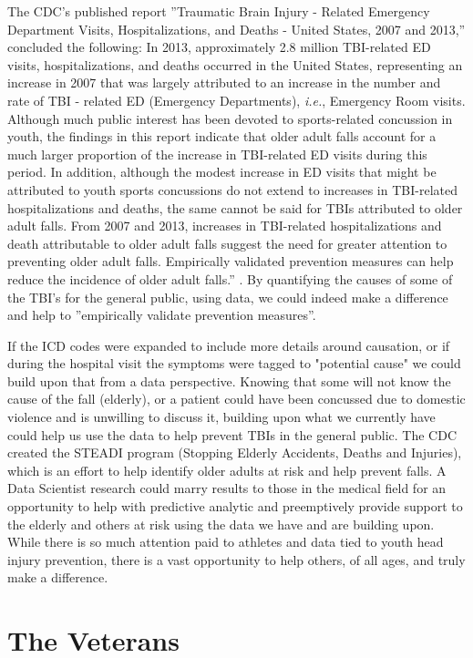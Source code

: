 \documentclass[sigconf]{acmart}
\begin{document}
The CDC's published report ''Traumatic Brain Injury - Related Emergency Department Visits, Hospitalizations, and Deaths - United States, 2007 and 2013,'' concluded the following: In 2013, approximately 2.8 million TBI-related ED visits, hospitalizations, and deaths occurred in the United States, representing an increase in 2007 that was largely attributed to an increase in the number and rate of TBI - related ED (Emergency Departments), {\em i.e.}, Emergency Room visits.  Although much public interest has been devoted to sports-related concussion in youth, the findings in this report indicate that older adult falls account for a much larger proportion of the increase in TBI-related ED visits during this period.  In addition, although the modest increase in ED visits that might be attributed to youth sports concussions do not extend to increases in TBI-related hospitalizations and deaths, the same cannot be said for TBIs attributed to older adult falls.  From 2007 and 2013, increases in TBI-related hospitalizations and death attributable to older adult falls suggest the need for greater attention to preventing older adult falls.  Empirically validated prevention measures can help reduce the incidence of older adult falls.'' \cite{www-cdc-gov}.  By quantifying the causes of some of the TBI's for the general public, using data, we could indeed make a difference and help to ''empirically validate prevention measures''.

If the ICD codes were expanded to include more details around causation, or if during the hospital visit the symptoms were tagged to "potential cause" we could build upon that from a data perspective.  Knowing that some will not know the cause of the fall (elderly), or a patient could have been concussed due to domestic violence and is unwilling to discuss it, building upon what we currently have could help us use the data to help prevent TBIs in the general public.  The CDC created the STEADI program (Stopping Elderly Accidents, Deaths and Injuries), which is an effort to help identify older adults at risk and help prevent falls.  A Data Scientist research could marry results to those in the medical field for an opportunity to help with predictive analytic and preemptively provide support to the elderly and others at risk using the data we have and are building upon.  While there is so much attention paid to athletes and data tied to youth head injury prevention, there is a vast opportunity to help others, of all ages, and truly make a difference.  

\section{The Veterans}
\end{document}
